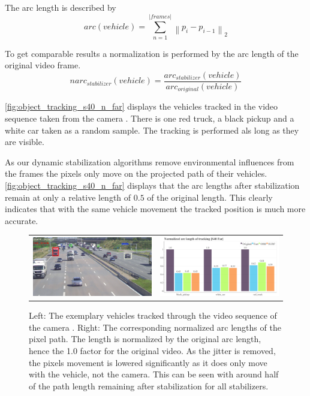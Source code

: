 The arc length is described by
\begin{equation}
    arc(vehicle) = \sum_{n = 1}^{\left\lvert frames \right\rvert } \left\lVert 
        p_{i} - p_{i-1}
    \right\rVert _2
\end{equation} 

To get comparable results a normalization is performed by the arc length of the original video frame.
\begin{equation}
    narc_{stabilizer}(vehicle) = 
    \frac{arc_{stabilizer}(vehicle)}{arc_{original}(vehicle)}
\end{equation} 

\autoref{fig:object_tracking_s40_n_far} displays the vehicles tracked in the video sequence taken from the camera . 
There is one red truck, a black pickup and a white car taken as a random sample.
The tracking is performed als long as they are visible.

As our dynamic stabilization algorithms remove environmental influences from the frames the pixels only move on the projected path of their vehicles.
\autoref{fig:object_tracking_s40_n_far} displays that the arc lengths after stabilization remain at only a relative length of $0.5$ of the original length.
This clearly indicates that with the same vehicle movement the tracked position is much more accurate.

\begin{figure}[!ht]
    \centering
    \begin{tabular}{cc}
      \includegraphics[width=0.475\linewidth]{diagrams/object_tracking/s40_n_far/frame_cropped.png}    &  
      \includegraphics[width=0.475\linewidth]{diagrams/object_tracking/s40_n_far/arcs.png}    
\end{tabular}
    \caption{Left: 
    The exemplary vehicles tracked through the video sequence of the camera . 
    Right:
    The corresponding normalized arc lengths of the pixel path. 
    The length is normalized by the original arc length, hence the 1.0 factor for the original video. 
    As the jitter is removed, the pixels movement is lowered significantly as it does only move with the vehicle, not the camera.
    This can be seen with around half of the path length remaining after stabilization for all stabilizers.
    }
    \label{fig:object_tracking_s40_n_far}
\end{figure}

